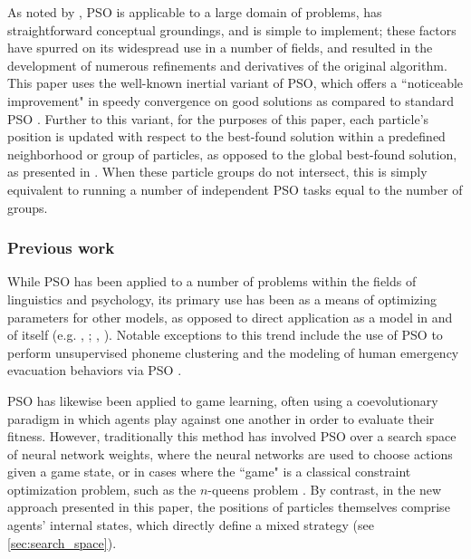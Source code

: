 \documentclass[11pt]{article}
\begin{document}
As noted by \citet*{yang2014}, PSO is applicable to a large domain of problems, has straightforward conceptual groundings, and is simple to implement; these factors have spurred on its widespread use in a number of fields, and resulted in the development of numerous refinements and derivatives of the original algorithm. This paper uses the well-known inertial variant of PSO, which offers a ``noticeable improvement" in speedy convergence on good solutions as compared to standard PSO \citep{yang2014}. Further to this variant, for the purposes of this paper, each particle's position is updated with respect to the best-found solution within a predefined neighborhood or group of particles, as opposed to the global best-found solution, as presented in \citet*{solnon2010}. When these particle groups do not intersect, this is simply equivalent to running a number of independent PSO tasks equal to the number of groups.



\subsubsection{Previous work}
\label{sec:pso_prev_work}

While PSO has been applied to a number of problems within the fields of linguistics and psychology, its primary use has been as a means of optimizing parameters for other models, as opposed to direct application as a model in and of itself (e.g. \citeauthor{chatterjee2005}, \citeyear{chatterjee2005}; \citeauthor{mehdad2009}, \citeyear{mehdad2009}). Notable exceptions to this trend include the use of PSO to perform unsupervised phoneme clustering \citep{ahmadi2007} and the modeling of human emergency evacuation behaviors via PSO \citep{cheng2008}.

PSO has likewise been applied to game learning, often using a coevolutionary paradigm in which agents play against one another in order to evaluate their fitness. However, traditionally this method has involved PSO over a search space of neural network weights, where the neural networks are used to choose actions given a game state, or in cases where the ``game" is a classical constraint optimization problem, such as the $n$-queens problem \citep{engelbrecht2005}. By contrast, in the new approach presented in this paper, the positions of particles themselves comprise agents' internal states, which directly define a mixed strategy (see \autoref{sec:search_space}).  
\end{document}
